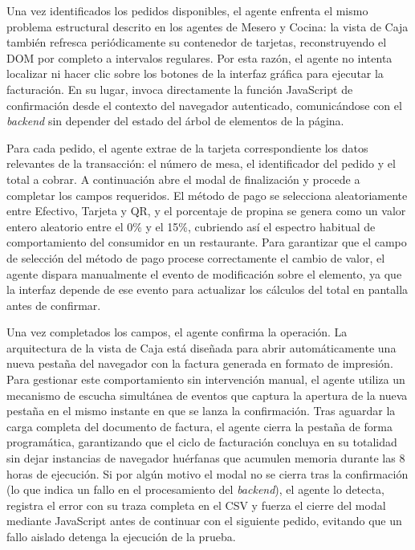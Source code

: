 Una vez identificados los pedidos disponibles, el agente enfrenta el mismo problema estructural descrito en los agentes de Mesero y Cocina: la vista de Caja también refresca periódicamente su contenedor de tarjetas, reconstruyendo el DOM por completo a intervalos regulares. Por esta razón, el agente no intenta localizar ni hacer clic sobre los botones de la interfaz gráfica para ejecutar la facturación. En su lugar, invoca directamente la función JavaScript de confirmación desde el contexto del navegador autenticado, comunicándose con el \textit{backend} sin depender del estado del árbol de elementos de la página.

Para cada pedido, el agente extrae de la tarjeta correspondiente los datos relevantes de la transacción: el número de mesa, el identificador del pedido y el total a cobrar. A continuación abre el modal de finalización y procede a completar los campos requeridos. El método de pago se selecciona aleatoriamente entre Efectivo, Tarjeta y QR, y el porcentaje de propina se genera como un valor entero aleatorio entre el 0\% y el 15\%, cubriendo así el espectro habitual de comportamiento del consumidor en un restaurante. Para garantizar que el campo de selección del método de pago procese correctamente el cambio de valor, el agente dispara manualmente el evento de modificación sobre el elemento, ya que la interfaz depende de ese evento para actualizar los cálculos del total en pantalla antes de confirmar.

Una vez completados los campos, el agente confirma la operación. La arquitectura de la vista de Caja está diseñada para abrir automáticamente una nueva pestaña del navegador con la factura generada en formato de impresión. Para gestionar este comportamiento sin intervención manual, el agente utiliza un mecanismo de escucha simultánea de eventos que captura la apertura de la nueva pestaña en el mismo instante en que se lanza la confirmación. Tras aguardar la carga completa del documento de factura, el agente cierra la pestaña de forma programática, garantizando que el ciclo de facturación concluya en su totalidad sin dejar instancias de navegador huérfanas que acumulen memoria durante las 8 horas de ejecución. Si por algún motivo el modal no se cierra tras la confirmación (lo que indica un fallo en el procesamiento del \textit{backend}), el agente lo detecta, registra el error con su traza completa en el CSV y fuerza el cierre del modal mediante JavaScript antes de continuar con el siguiente pedido, evitando que un fallo aislado detenga la ejecución de la prueba.

